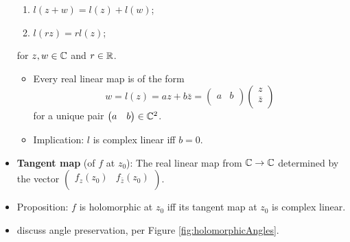 \documentclass[../notes.tex]{subfiles}
\begin{document}
\begin{itemize}
    \begin{enumerate}
        \item $l(z+w)=l(z)+l(w)$;
        \item $l(rz)=rl(z)$;
    \end{enumerate}
    for $z,w\in\mathbb{C}$ and $r\in\mathbb{R}$.
    \begin{itemize}
        \item Every real linear map is of the form
        \begin{equation*}
            w = l(z)
            = az+b\bar{z}
            =
            \begin{pmatrix}
                a & b\\
            \end{pmatrix}
            \begin{pmatrix}
                z\\
                \bar{z}\\
            \end{pmatrix}
        \end{equation*}
        for a unique pair $
            \begin{pmatrix}
                a & b\\
            \end{pmatrix}
            \in\mathbb{C}^2
        $.
        \item Implication: $l$ is complex linear iff $b=0$.
    \end{itemize}
    \item \textbf{Tangent map} (of $f$ at $z_0$): The real linear map from $\mathbb{C}\to\mathbb{C}$ determined by the vector $
        \begin{pmatrix}
            f_z(z_0) & f_{\bar{z}}(z_0)\\
        \end{pmatrix}
    $.
    \item Proposition: $f$ is holomorphic at $z_0$ iff its tangent map at $z_0$ is complex linear.
    \item \textcite{bib:FischerLieb} discuss angle preservation, per Figure \ref{fig:holomorphicAngles}.
\end{itemize}
\end{document}
